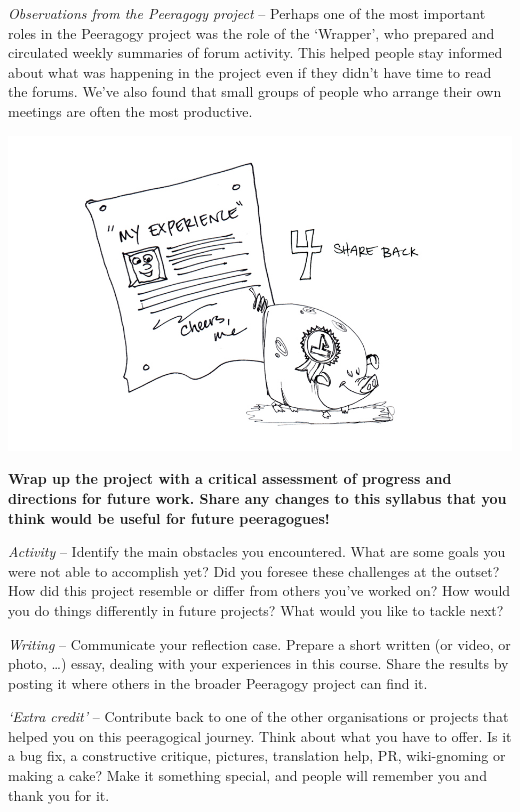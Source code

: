 \emph{Observations from the Peeragogy project} -- Perhaps one of the
most important roles in the Peeragogy project was the role of the
`Wrapper', who prepared and circulated weekly summaries of forum
activity. This helped people stay informed about what was happening in
the project even if they didn't have time to read the forums. We've also
found that small groups of people who arrange their own meetings are
often the most productive.

\begin{center}
\includegraphics{./pictures/OpenBook-2-4.jpg}
\end{center}

\textbf{Wrap up the project with a critical assessment of progress and
directions for future work. Share any changes to this syllabus that you
think would be useful for future peeragogues!}

\emph{Activity} -- Identify the main obstacles you encountered. What are
some goals you were not able to accomplish yet? Did you foresee these
challenges at the outset? How did this project resemble or differ from
others you've worked on? How would you do things differently in future
projects? What would you like to tackle next?

\emph{Writing} -- Communicate your reflection case. Prepare a short
written (or video, or photo, \ldots{}) essay, dealing with your
experiences in this course. Share the results by posting it where others
in the broader Peeragogy project can find it.

\emph{`Extra credit'} -- Contribute back to one of the other
organisations or projects that helped you on this peeragogical journey.
Think about what you have to offer. Is it a bug fix, a constructive
critique, pictures, translation help, PR, wiki-gnoming or making a cake?
Make it something special, and people will remember you and thank you
for it.

